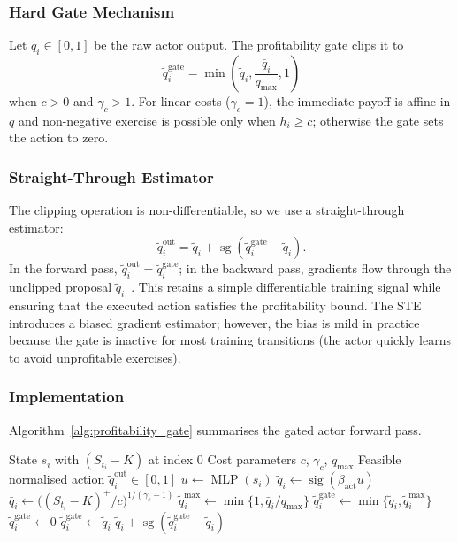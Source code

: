 \documentclass[a4paper,fleqn]{cas-dc}
\DeclareMathOperator{\sg}{sg}
\begin{document}
\subsubsection{Hard Gate Mechanism}

Let $\tilde{q}_i \in [0,1]$ be the raw actor output. The profitability gate clips it to
\[
\tilde{q}_i^{\mathrm{gate}} =
\min\!\left(
\tilde{q}_i,
\frac{\bar{q}_i}{q_{\max}},
1
\right)
\]
when $c > 0$ and $\gamma_c > 1$. For linear costs ($\gamma_c = 1$), the immediate payoff is affine in $q$ and non-negative exercise is possible only when $h_i \ge c$; otherwise the gate sets the action to zero.

\subsubsection{Straight-Through Estimator}

The clipping operation is non-differentiable, so we use a straight-through estimator:
\[
\tilde{q}_i^{\mathrm{out}}
=
\tilde{q}_i + \sg\!\left(\tilde{q}_i^{\mathrm{gate}} - \tilde{q}_i\right).
\]
In the forward pass, $\tilde{q}_i^{\mathrm{out}} = \tilde{q}_i^{\mathrm{gate}}$; in the backward pass, gradients flow through the unclipped proposal $\tilde{q}_i$~\cite{bengio2013ste}. This retains a simple differentiable training signal while ensuring that the executed action satisfies the profitability bound. The STE introduces a biased gradient estimator; however, the bias is mild in practice because the gate is inactive for most training transitions (the actor quickly learns to avoid unprofitable exercises).

\subsubsection{Implementation}

Algorithm~\ref{alg:profitability_gate} summarises the gated actor forward pass.

\begin{algorithm}[htbp]
\caption{Profitability-gated actor forward pass}
\label{alg:profitability_gate}
\begin{algorithmic}[1]
\Require State $s_i$ with $(S_{t_i} - K)$ at index $0$
\Require Cost parameters $c$, $\gamma_c$, $q_{\max}$
\Ensure Feasible normalised action $\tilde{q}_i^{\mathrm{out}} \in [0,1]$
\State $u \gets \operatorname{MLP}(s_i)$
\State $\tilde{q}_i \gets \operatorname{sig}(\beta_{\mathrm{act}} u)$ 
    \State $\bar{q}_i \gets \bigl((S_{t_i}-K)^+/c\bigr)^{1/(\gamma_c-1)}$
    \State $\tilde{q}_i^{\max} \gets \min\{1,\bar{q}_i/q_{\max}\}$
    \State $\tilde{q}_i^{\mathrm{gate}} \gets \min\{\tilde{q}_i,\tilde{q}_i^{\max}\}$
    \State $\tilde{q}_i^{\mathrm{gate}} \gets 0$
\Else
    \State $\tilde{q}_i^{\mathrm{gate}} \gets \tilde{q}_i$
\EndIf
\State \Return $\tilde{q}_i + \sg(\tilde{q}_i^{\mathrm{gate}} - \tilde{q}_i)$
\end{algorithmic}
\end{algorithm}
\end{document}
